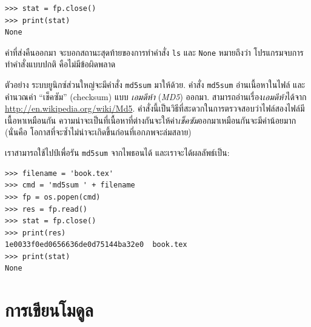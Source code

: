 \begin{verbatim}
>>> stat = fp.close()
>>> print(stat)
None
\end{verbatim}
%
%
ค่าที่ส่งคืนออกมา จะบอกสถานะสุดท้ายของการทำคำสั่ง \texttt{ls}
และ \texttt{None} หมายถึงว่า โปรแกรมจบการทำคำสั่งแบบปกติ คือไม่มีข้อผิดพลาด


ตัวอย่าง ระบบยูนิกซ์ส่วนใหญ่จะมีคำสั่ง \texttt{md5sum} มาให้ด้วย.
คำสั่ง \texttt{md5sum} อ่านเนื้อหาในไฟล์ และคำนวณค่า ``เช็คซัม'' (checksum) แบบ \textit{เอมดีห้า} (\textit{MD5}) ออกมา.
สามารถอ่านเรื่อง\textit{เอมดีห้า}ได้จาก \url{http://en.wikipedia.org/wiki/Md5}. 
คำสั่งนี้เป็นวิธีที่สะดวกในการตรวจสอบว่าไฟล์สองไฟล์มีเนื้อหาเหมือนกัน
ความน่าจะเป็นที่เนื้อหาที่ต่างกันจะให้ค่า\textit{เช็คซัม}ออกมาเหมือนกันจะมีค่าน้อยมาก
(นั่นคือ โอกาสที่จะซ้ำไม่น่าจะเกิดขึ้นก่อนที่เอกภพจะล่มสลาย)

%
เราสามารถใช้ไปป์เพื่อรัน \texttt{md5sum} จากไพธอนได้
และเราจะได้ผลลัพธ์เป็น:

\begin{verbatim}
>>> filename = 'book.tex'
>>> cmd = 'md5sum ' + filename
>>> fp = os.popen(cmd)
>>> res = fp.read()
>>> stat = fp.close()
>>> print(res)
1e0033f0ed0656636de0d75144ba32e0  book.tex
>>> print(stat)
None
\end{verbatim}



\section{การเขียนโมดูล}
\label{modules}


